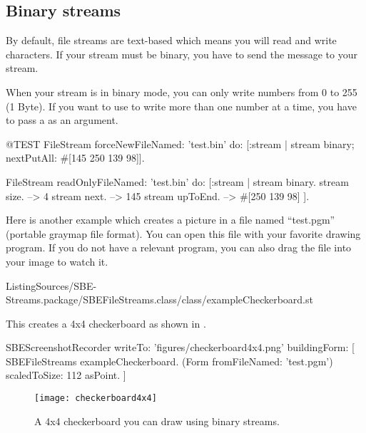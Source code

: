 \documentclass[a4paper,10pt,twoside]{book}
\begin{document}
\subsection{Binary streams}
\label{sec:binary-streams}

By default, file streams are text-based which means you will read and write characters.
If your stream must be binary, you have to send the message  to your stream.

When your stream is in binary mode, you can only write numbers from 0 to 255 (1 Byte).
If you want to use  to write more than one number at a time, you have to pass a  as an argument.

\begin{code}{@TEST}
FileStream
  forceNewFileNamed: 'test.bin'
  do: [:stream |
          stream
            binary;
            nextPutAll: #[145 250 139 98]].

FileStream
  readOnlyFileNamed: 'test.bin'
  do: [:stream |
          stream binary.
          stream size.         --> 4
          stream next.         --> 145
          stream upToEnd. --> #[250 139 98]
      ].
\end{code}

Here is another example which creates a picture in a file named ``test.pgm'' (portable graymap file format).
You can open this file with your favorite drawing program.
If you do not have a relevant program, you can also drag the file into your \sq image to watch it.

%
{ListingSources/SBE-Streams.package/SBEFileStreams.class/class/exampleCheckerboard.st}

This creates a 4x4 checkerboard as shown in .

\begin{ExecuteSmalltalkScript}
SBEScreenshotRecorder writeTo: 'figures/checkerboard4x4.png' buildingForm: [
	SBEFileStreams exampleCheckerboard.
	(Form fromFileNamed: 'test.pgm') scaledToSize: 112 asPoint.
]
\end{ExecuteSmalltalkScript}
\begin{figure}[!ht]
\centerline{\texttt{[image: checkerboard4x4]}}
\caption{A 4x4 checkerboard you can draw using binary streams.}
\label{fig:checkerboard4x4}
\vspace{.2in}
\end{figure}
\end{document}
